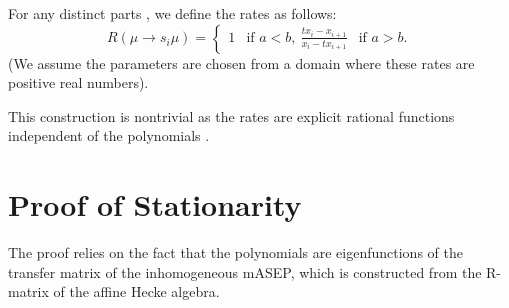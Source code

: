 \documentclass[12pt]{article}
\begin{document}
For any distinct parts , we define the rates as follows:
\begin{equation} \label{eq:rates}
R(\mu \to s_i \mu) =
\begin{cases}
1 & \text{if } a < b, \
\displaystyle \frac{t x_i - x_{i+1}}{x_i - t x_{i+1}} & \text{if } a > b.
\end{cases}
\end{equation}
(We assume the parameters  are chosen from a domain where these rates are positive real numbers).

This construction is nontrivial as the rates are explicit rational functions independent of the polynomials .

\section{Proof of Stationarity}

The proof relies on the fact that the polynomials  are eigenfunctions of the transfer matrix of the inhomogeneous mASEP, which is constructed from the R-matrix of the affine Hecke algebra.
\end{document}
